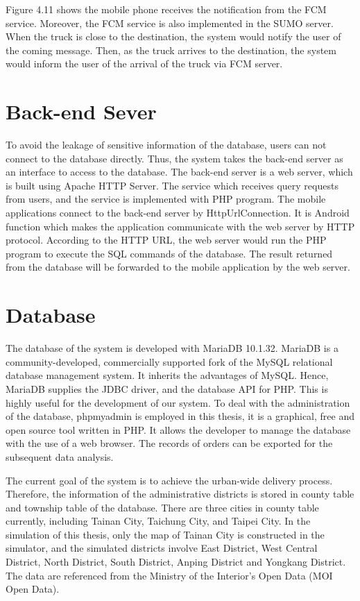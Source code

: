 \documentclass[12pt]{ksthesis}
\begin{document}
\begin{thesis}
{Figure 4.11 shows the mobile phone receives the notification from the FCM service. Moreover, the FCM service is also implemented in the SUMO server. 
When the truck is close to the destination, the system would notify the user of the coming message. Then, as the truck arrives to the destination, the system would inform the user of the arrival of the truck via FCM server.



\section{Back-end Sever}
To avoid the leakage of sensitive information of the database, users can not connect to the database directly. Thus, the system takes the back-end server as an interface to access to the database. The back-end server is a web server, which is built using Apache HTTP Server. The service which receives query requests from users, and the service is implemented with PHP program. 
The mobile applications connect to the back-end server by HttpUrlConnection. It is Android function which makes the application communicate with the web server by HTTP protocol. According to the HTTP URL, the web server would run the PHP program to execute the SQL commands of the database. The result returned from the database will be forwarded to the mobile application by the web server. 


\section{Database}
The database of the system is developed with MariaDB 10.1.32. MariaDB is a community-developed, commercially supported fork of the MySQL relational database management system. It inherits the advantages of MySQL. Hence, MariaDB supplies the JDBC driver, and the database API for PHP. This is highly useful for the development of our system. To deal with the administration of the database, phpmyadmin is employed in this thesis, it is a graphical, free and open source tool written in PHP. It allows the developer to manage the database with the use of a web browser. The records of orders can be exported for the subsequent data analysis.

The current goal of the system is to achieve the urban-wide delivery process. Therefore, the information of the administrative districts is stored in county table and township table of the database. There are three cities in county table currently, including Tainan City, Taichung City, and Taipei City. In the simulation of this thesis, only the map of Tainan City is constructed in the simulator, and the simulated districts involve East District, West Central District, North District, South District, Anping District and Yongkang District. The data are referenced from the Ministry of the Interior’s Open Data (MOI Open Data).








}
\end{thesis}
\end{document}
